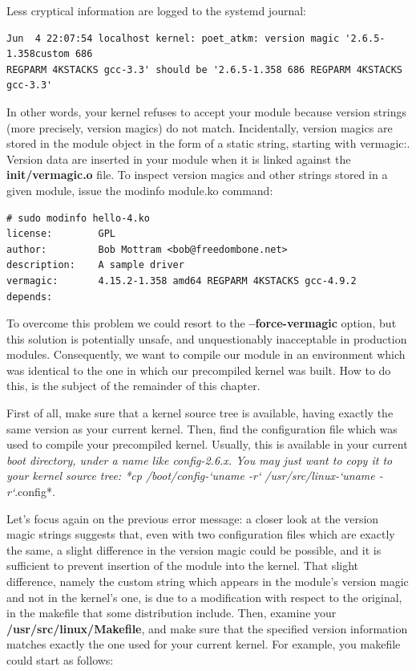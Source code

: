 \documentclass[11pt]{article}
\begin{document}
Less cryptical information are logged to the systemd journal:

\begin{verbatim}
Jun  4 22:07:54 localhost kernel: poet_atkm: version magic '2.6.5-1.358custom 686
REGPARM 4KSTACKS gcc-3.3' should be '2.6.5-1.358 686 REGPARM 4KSTACKS gcc-3.3'
\end{verbatim}

In other words, your kernel refuses to accept your module because version strings (more precisely, version magics) do not match. Incidentally, version magics are stored in the module object in the form of a static string, starting with vermagic:. Version data are inserted in your module when it is linked against the \textbf{init/vermagic.o} file. To inspect version magics and other strings stored in a given module, issue the modinfo module.ko command:

\begin{verbatim}
# sudo modinfo hello-4.ko
license:        GPL
author:         Bob Mottram <bob@freedombone.net>
description:    A sample driver
vermagic:       4.15.2-1.358 amd64 REGPARM 4KSTACKS gcc-4.9.2
depends:
\end{verbatim}

To overcome this problem we could resort to the \textbf{--force-vermagic} option, but this solution is potentially unsafe, and unquestionably inacceptable in production modules. Consequently, we want to compile our module in an environment which was identical to the one in which our precompiled kernel was built. How to do this, is the subject of the remainder of this chapter.

First of all, make sure that a kernel source tree is available, having exactly the same version as your current kernel. Then, find the configuration file which was used to compile your precompiled kernel. Usually, this is available in your current \emph{boot directory, under a name like config-2.6.x. You may just want to copy it to your kernel source tree: *cp /boot/config-`uname -r` /usr/src/linux-`uname -r`}.config*.

Let's focus again on the previous error message: a closer look at the version magic strings suggests that, even with two configuration files which are exactly the same, a slight difference in the version magic could be possible, and it is sufficient to prevent insertion of the module into the kernel. That slight difference, namely the custom string which appears in the module's version magic and not in the kernel's one, is due to a modification with respect to the original, in the makefile that some distribution include. Then, examine your \textbf{/usr/src/linux/Makefile}, and make sure that the specified version information matches exactly the one used for your current kernel. For example, you makefile could start as follows:
\end{document}
